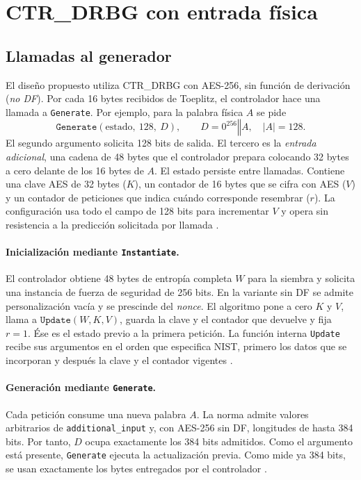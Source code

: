 \documentclass[11pt,a4paper]{article}
\newcommand{\cat}{\mathbin\Vert}
\begin{document}
\section{CTR\_DRBG con entrada física}\label{sec:ctr}
\subsection{Llamadas al generador}
El diseño propuesto utiliza CTR\_DRBG con AES-256, sin función de derivación (\emph{no DF}). Por cada 16 bytes recibidos de Toeplitz, el controlador hace una llamada a \texttt{Generate}. Por ejemplo, para la palabra física \(A\) se pide
\begin{equation}
 \texttt{Generate}(\text{estado},\ 128,\ D),\qquad
 D=0^{256}\cat A,\quad |A|=128 .
 \label{eq:input}
\end{equation}
El segundo argumento solicita 128 bits de salida. El tercero es la \emph{entrada adicional}, una cadena de 48 bytes que el controlador prepara colocando 32 bytes a cero delante de los 16 bytes de \(A\). El estado persiste entre llamadas. Contiene una clave AES de 32 bytes (\(K\)), un contador de 16 bytes que se cifra con AES (\(V\)) y un contador de peticiones que indica cuándo corresponde resembrar (\(r\)). La configuración usa todo el campo de 128 bits para incrementar \(V\) y opera sin resistencia a la predicción solicitada por llamada \cite[tabla~3, p.~49, y §10.2.1.1]{nist90a}.

\paragraph{Inicialización mediante \texttt{Instantiate}.}
El controlador obtiene 48 bytes de entropía completa \(W\) para la siembra y solicita una instancia de fuerza de seguridad de 256 bits. En la variante sin DF se admite personalización vacía y se prescinde del \emph{nonce}. El algoritmo pone a cero \(K\) y \(V\), llama a \(\texttt{Update}(W,K,V)\), guarda la clave y el contador que devuelve y fija \(r=1\). Ése es el estado previo a la primera petición. La función interna \texttt{Update} recibe sus argumentos en el orden que especifica NIST, primero los datos que se incorporan y después la clave y el contador vigentes \cite[§10.2.1, p.~50, y §10.2.1.3.1, pasos~1--8]{nist90a}.

\paragraph{Generación mediante \texttt{Generate}.}
Cada petición consume una nueva palabra \(A\). La norma admite valores arbitrarios de \texttt{additional\_input} y, con AES-256 sin DF, longitudes de hasta 384 bits. Por tanto, \(D\) ocupa exactamente los 384 bits admitidos. Como el argumento está presente, \texttt{Generate} ejecuta la actualización previa. Como mide ya 384 bits, se usan exactamente los bytes entregados por el controlador \cite[§8.7.2, tabla~3 y §10.2.1.5.1, paso~2]{nist90a}.
\end{document}
